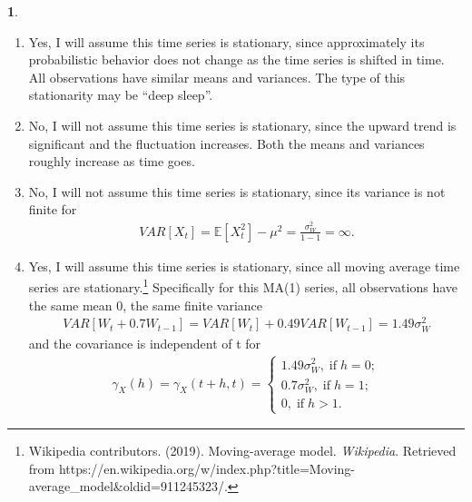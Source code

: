 \documentclass[10pt]{article}
\newtheorem{prob}{\bm{$Problem$}}
\begin{document}
\begin{prob}
\end{prob}
\begin{enumerate}[1)]
\vspace{3mm}

\item
Yes, I will assume this time series is stationary, since approximately its probabilistic behavior does not change as the time series is shifted in time. All observations have similar means and variances. The type of this stationarity may be ``deep sleep''. %
\vspace{3mm}

\item
No, I will not assume this time series is stationary, since the upward trend is significant and the fluctuation increases. Both the means and variances roughly increase as time goes.
\vspace{3mm}

\item
No, I will not assume this time series is stationary, since its variance is not finite for
\begin{align*}
VAR[X_t]=\mathbb{E}[X^2_t]-\mu^2=\frac{\sigma^2_W}{1-1}=\infty. %
\end{align*}
\vspace{3mm}

\item %
Yes, I will assume this time series is stationary, since all moving average time series are stationary.\footnote{ Wikipedia contributors. (2019). Moving-average model. \textit{Wikipedia}. Retrieved from https://en.wikipedia.org/w/index.php?title=Moving-average\_model\&oldid=911245323/.} Specifically for this MA(1) series, all observations have the same mean 0, the same finite variance
\begin{align*}
VAR[W_t+0.7W_{t-1}]=VAR[W_t]+0.49VAR[W_{t-1}]=1.49\sigma^2_W
\end{align*}
and the covariance is independent of t for
\begin{align*}
\gamma_X(h)=\gamma_X(t+h,t)=\left\{\begin{array}{ll}1.49\sigma^2_W,\;\textrm{if}\;h=0;\\
0.7\sigma^2_W,\;\textrm{if}\;h=1;\\
0,\;\textrm{if}\;h>1.\end{array}\right.
\end{align*}

\end{enumerate}
\vspace{3mm}
\end{document}

